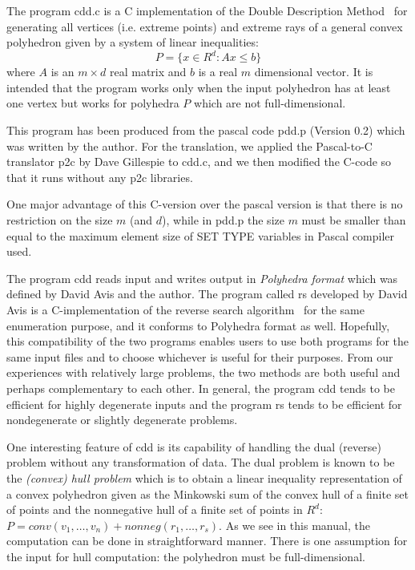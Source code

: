 The program  cdd.c  is a C implementation of 
the Double Description Method~\cite{MRTT}
for generating all vertices (i.e. extreme points)
and extreme rays of a general 
convex polyhedron given by a system of linear inequalities:
\[
   P = \{ x  \in R^d:  A  x  \le  b \}
\]
where $A$ is an $m \times d$ real matrix and $b$ is a real
$m$ dimensional vector.  It is intended that the program works 
only when the input polyhedron has at least one vertex but 
works for polyhedra $P$ which are not full-dimensional.    
 
This program has been produced
from the pascal code pdd.p (Version 0.2)
which was written by the author.   For the translation,
we applied the Pascal-to-C translator p2c
by Dave Gillespie to cdd.c, and we then modified
the C-code so that it runs without any p2c libraries.

One major advantage of this C-version over the pascal version is
that there is no restriction on the size  $m$ (and $d$), while in pdd.p
the size $m$ must be smaller than equal to the maximum element size
of SET TYPE variables in Pascal compiler used.

The program cdd reads input and writes output in 
{\em Polyhedra format\/} which was defined by David Avis and
the author.  The program called rs developed by David Avis is
a C-implementation of the reverse search algorithm~\cite{AF} 
for the same enumeration purpose, and it conforms to Polyhedra format as well.
Hopefully, this compatibility of the two programs
enables users to use both programs for the same input files
and to choose whichever is useful for their purposes.
From our experiences with relatively large problems,
the two methods are both useful and perhaps complementary
to each other.  In general, the program cdd tends to be
efficient for highly degenerate inputs and the program rs
tends to be efficient for nondegenerate or slightly
degenerate problems.

One interesting feature of cdd is its capability
of handling the dual (reverse)  problem without any transformation
of data.  The dual problem is known to be the 
{\em (convex) hull problem\/} which
is to obtain a linear inequality representation
of a convex polyhedron given as the Minkowski sum of 
the convex hull of a finite set of points and the nonnegative
hull of a finite set of points in $R^d$: 
$P = conv(v_1,\ldots,v_n) +  nonneg(r_1,\ldots,r_s)$.
As we see in this manual, the computation can be done
in straightforward manner.  There is one assumption for the input
for hull computation: the polyhedron must be full-dimensional.

